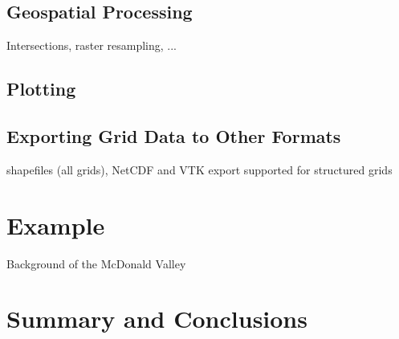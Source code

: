 \documentclass[utf8]{frontiersSCNS} %
\begin{document}
\subsection{Geospatial Processing}

Intersections, raster resampling, ...

\subsection{Plotting}

\subsection{Exporting Grid Data to Other Formats}

shapefiles (all grids), NetCDF and VTK export supported for structured grids

\section{Example}

Background of the McDonald Valley

\section{Summary and Conclusions}





\end{document}
